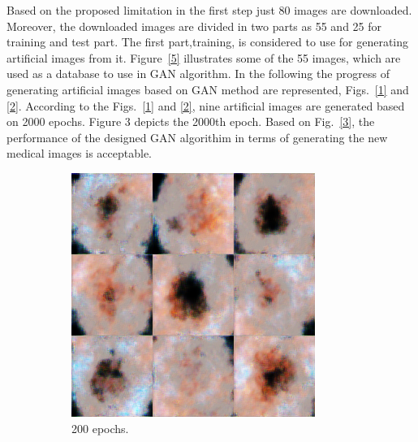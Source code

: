\documentclass[conference]{IEEEtran}
\begin{document}
Based on the proposed limitation in the first step just 80 images are downloaded. Moreover, the downloaded images are divided in two parts as 55 and 25 for training and test part. The first part,training, is considered to use for generating artificial images from it. Figure~\ref{5} illustrates some of the 55 images, which are used as a database to use in GAN algorithm. In the following the progress of generating artificial images based on GAN method are represented, Figs.~\ref{1} and \ref{2}. According to the Figs.~\ref{1} and \ref{2}, nine artificial images are generated based on 2000 epochs. Figure 3
depicts the 2000th epoch. Based on Fig.~\ref{3}, the performance of the designed GAN algorithim in terms of generating the new medical images is acceptable.
\begin{figure}
    \centering
    \begin{subfigure}[t]{0.15\textwidth}
             \centering

        \includegraphics[width=\textwidth]{4.png}
        \caption{200 epochs.}
        \label{fig:1}
    \end{subfigure}
~
    \begin{subfigure}[t]{0.15\textwidth}
             \centering


\end{subfigure}
\end{figure}
\end{document}
